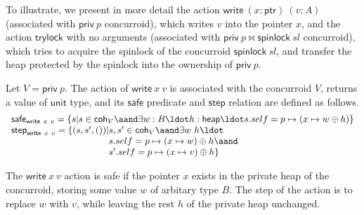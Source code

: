 To illustrate, we present in more detail the action
$\mathsf{write}\ (x : \mathsf{ptr})\ (v : A)$ (associated with
$\mathsf{priv}\ p$ concurroid), which writes $v$ into the pointer $x$,
and the action $\mathsf{trylock}$ with no arguments (associated with
$\mathsf{priv}\ p \bowtie \mathsf{spinlock}\ sl$ concurroid), which
tries to acquire the spinlock of the concurroid
$\mathsf{spinlock}\ sl$, and transfer the heap protected by the
spinlock into the ownership of $\mathsf{priv}\ p$.

Let $V = \mathsf{priv}\ p$. The action of $\mathsf{write}\ x\ v$ is
associated with the concurroid $V$, returns a value of $\mathsf{unit}$
type, and its $\mathsf{safe}$ predicate and $\mathsf{step}$ relation
are defined as follows.
\[
\begin{array}{l}
\mathsf{safe}_{\mathsf{write}\ x\ v} = 
  \{s | s \in \mathsf{coh}_V \aand \exists w:B\ldot h:\mathsf{heap}\ldot s.self = p \mapsto (x \mapsto w \oplus h)\}\\
\mathsf{step}_{\mathsf{write}\ x\ v} = 
  \{(s, s', ()) | \!\!\!\begin{array}[t]{l}
                s, s' \in \mathsf{coh}_V \aand \exists w\ h\ldot \hbox{}\\
                s.self = p \mapsto (x \mapsto w) \oplus h \aand \hbox{}\\
                s'.self = p \mapsto (x \mapsto v) \oplus h\}
             \end{array}
\end{array}
\]

The $\mathsf{write}\ x\ v$ action is safe if the pointer $x$ exists in
the private heap of the concurroid, storing some value $w$ of arbitary
type $B$. The step of the action is to replace $w$ with $v$, while
leaving the rest $h$ of the private heap unchanged. 


